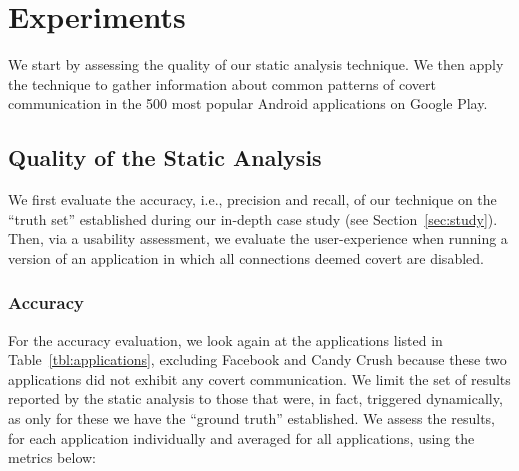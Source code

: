 

\section{Experiments}
\label{sec:evaluation}
We start by assessing the quality of our static analysis technique. 
We then apply the technique to gather information about common patterns of covert communication in the 500 most popular Android applications on Google Play. 


\subsection{Quality of the Static Analysis}
We first evaluate the accuracy, i.e., precision and recall, of our technique on the ``truth set'' established during our in-depth case study (see Section~\ref{sec:study}).
Then, via a usability assessment, we evaluate the user-experience when running a version of an application in which all connections deemed covert are disabled. 

\subsubsection{Accuracy}
For the accuracy evaluation, we look again at the applications listed in 
Table~\ref{tbl:applications}, excluding Facebook and Candy Crush because these two applications  did not exhibit any covert communication. We limit the set of results reported by the static analysis to those that were, in fact, triggered dynamically, as only for these we have the ``ground truth'' established. 
We assess the results, for each application individually and averaged for all applications, using the metrics below:

